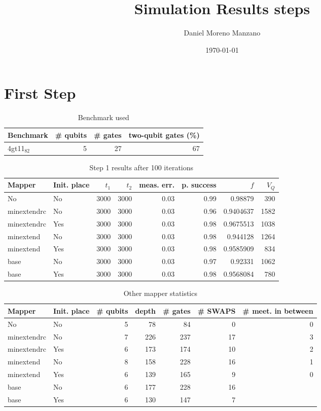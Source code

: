 \documentclass[11pt]{article}
\author{Daniel Moreno Manzano}
\date{\today}
\title{Simulation Results steps}
\begin{document}
\maketitle


\section{First Step}
\label{sec:org554f0ff}

\begin{table}[!htpb]
\caption{\label{tab:orgeb4b20a}
Benchmark used}
\centering
\begin{tabular}{lrrr}
\hline
Benchmark & \# qubits & \# gates & two-qubit gates (\%)\\
\hline
4gt11\(_{\text{82}}\) & 5 & 27 & 67\\
\hline
\end{tabular}
\end{table}

\begin{table}[!htpb]
\caption{\label{tab:org3ef9da6}
Step 1 results after 100 iterations}
\centering
\begin{tabular}{llrrrrrr}
\hline
Mapper & Init. place & \(t_1\) & \(t_2\) & meas. err. & p. success & \(f\) & \(V_Q\)\\
\hline
No & No & 3000 & 3000 & 0.03 & 0.99 & 0.98879 & 390\\
\hline
minextendrc & No & 3000 & 3000 & 0.03 & 0.96 & 0.9404637 & 1582\\
minextendrc & Yes & 3000 & 3000 & 0.03 & 0.98 & 0.9675513 & 1038\\
minextend & No & 3000 & 3000 & 0.03 & 0.98 & 0.944128 & 1264\\
minextend & Yes & 3000 & 3000 & 0.03 & 0.98 & 0.9585909 & 834\\
base & No & 3000 & 3000 & 0.03 & 0.97 & 0.92331 & 1062\\
base & Yes & 3000 & 3000 & 0.03 & 0.98 & 0.9568084 & 780\\
\hline
\end{tabular}
\end{table}

\begin{table}[!htpb]
\caption{\label{tab:org9582490}
Other mapper statistics}
\centering
\small
\begin{tabular}{llrrrrr}
\hline
Mapper & Init. place & \# qubits & depth & \# gates & \# SWAPS & \# meet. in between\\
\hline
No & No & 5 & 78 & 84 & 0 & 0\\
\hline
minextendrc & No & 7 & 226 & 237 & 17 & 3\\
minextendrc & Yes & 6 & 173 & 174 & 10 & 2\\
minextend & No & 8 & 158 & 228 & 16 & 1\\
minextend & Yes & 6 & 139 & 165 & 9 & 0\\
base & No & 6 & 177 & 228 & 16 & \\
base & Yes & 6 & 130 & 147 & 7 & \\
\hline
\end{tabular}
\end{table}
\end{document}

